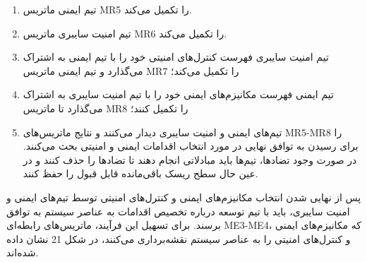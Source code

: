 \documentclass[a4paper,10pt]{article}
\begin{document}
                \begin{enumerate}
                    
                    \item تیم ایمنی ماتریس MR5 را تکمیل می‌کند.

                    \item تیم امنیت سایبری ماتریس MR6 را تکمیل می‌کند.

                    \item تیم امنیت سایبری فهرست کنترل‌های امنیتی خود را با تیم ایمنی به اشتراک می‌گذارد و تیم ایمنی ماتریس MR7 را تکمیل می‌کند؛

                    \item تیم ایمنی فهرست مکانیزم‌های ایمنی خود را با تیم امنیت سایبری به اشتراک می‌گذارد تا ماتریس MR8 را تکمیل کنند؛

                    \item تیم‌های ایمنی و امنیت سایبری دیدار می‌کنند و نتایج ماتریس‌های MR5-MR8 را برای رسیدن به توافق نهایی در مورد انتخاب اقدامات ایمنی و امنیتی بحث می‌کنند. در صورت وجود تضادها، تیم‌ها باید مبادلاتی انجام دهند تا تضادها را حذف کنند و در عین حال سطح ریسک باقی‌مانده قابل قبول را حفظ کنند.

                \end{enumerate}

                پس از نهایی شدن انتخاب مکانیزم‌های ایمنی و کنترل‌های امنیتی توسط تیم‌های ایمنی و امنیت سایبری، باید با تیم توسعه درباره تخصیص اقدامات به عناصر سیستم به توافق برسند. برای تسهیل این فرآیند، ماتریس‌های رابطه‌ای ME3-ME4، که مکانیزم‌های ایمنی و کنترل‌های امنیتی را به عناصر سیستم نقشه‌برداری می‌کنند، در شکل 21 نشان داده شده‌اند.
\end{document}
